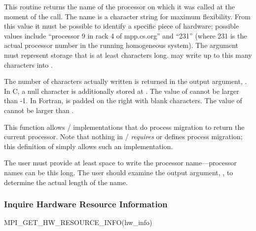 This routine returns the name of the processor on which it was called at the
moment of the call.
The name is a character string for maximum flexibility.  From
this value it must be possible to identify a specific piece of hardware;
possible values include ``processor 9 in rack 4 of mpp.cs.org'' and ``231''
(where 231 is the actual processor number in the running homogeneous system).
The argument  must represent storage that is at least
 characters long.
 may write up to this many characters into
.

The number of characters actually written
is returned in the output argument, .
In C, a null character is additionally stored at .
The value of  cannot be larger than -1.
In Fortran,  is padded on the right with blank characters.
The value of  cannot be larger than .

\begin{rationale}
This function allows \MPI/ implementations that do process
migration to return the current processor.  Note that nothing in \MPI/ 
\emph{requires} or defines process migration; this definition of
 simply allows such an implementation.
\end{rationale}

\begin{users}
The user must provide at least  space
to write the processor name---processor names can be this long.  The user
should examine the 
output 
argument, , to determine
the actual length of the name.
\end{users}

\subsubsection{Inquire Hardware Resource Information}
\label{subsubsec:inquiry-hw-resource-info}
    
\begin{funcdef}{MPI\_GET\_HW\_RESOURCE\_INFO}{(\mbox{hw\_info})}
\end{funcdef}

